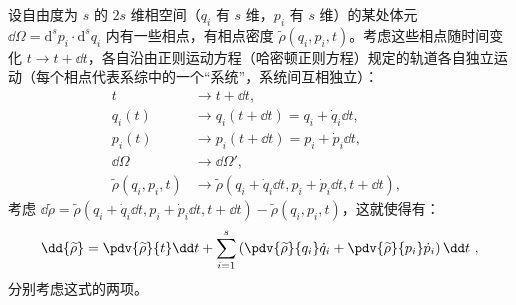 设自由度为 $s$ 的 $2s$ 维相空间（$q_i$ 有 $s$ 维，$p_i$ 有 $s$ 维）的某处体元 $\dd \Omega = \mathrm{d}^{s}{p_i} \cdot  \mathrm{d}^{s}{q_i}$ 内有一些相点，有相点密度 $\widetilde \rho(q_i, p_i, t)$。考虑这些相点随时间变化 $t \rightarrow t + \dd t$，各自沿由正则运动方程（哈密顿正则方程）规定的轨道各自独立运动（每个相点代表系综中的一个“系统”，系统间互相独立）：
$$
\begin{aligned}
t                            &\rightarrow t+\dd t, \\
q_i(t)                       &\rightarrow q_i(t+\dd t) = q_i + \dot q_i \dd t, \\
p_i(t)                       &\rightarrow p_i(t+\dd t) = p_i + \dot p_i \dd t, \\
\dd \Omega                   &\rightarrow \dd \Omega', \\
\widetilde \rho(q_i, p_i, t) &\rightarrow \widetilde \rho(q_i + \dot q_i \dd t, p_i + \dot p_i \dd t, t + \dd t),
\end{aligned}~~
$$
考虑 $\dd{\widetilde{\rho}} = \widetilde{\rho}(q_i + \dot q_i \dd t, p_i + \dot p_i \dd t, t + \dd t) - \widetilde{\rho}(q_i, p_i, t)$，这就使得有：
\begin{equation}
\dd{\widetilde \rho} = \pdv{\widetilde \rho}{t} \dd t + \sum_{i=1}^{s}\left(\pdv{\widetilde \rho}{q_i}\dot q_i + \pdv{\widetilde \rho}{p_i}\dot p_i\right) \dd t  ~,
\end{equation}
分别考虑这式的两项。